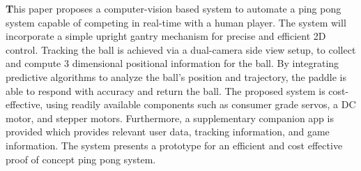 \textbf
This paper proposes a computer-vision based system to automate a ping pong system capable of competing in real-time with a human player. The system will incorporate a simple upright gantry mechanism for precise and efficient 2D control. Tracking the ball is achieved via a dual-camera side view setup, to collect and compute 3 dimensional positional information for the ball. By integrating predictive algorithms to analyze the ball's position and trajectory, the paddle is able to respond with accuracy and return the ball. The proposed system is cost-effective, using readily available components such as consumer grade servos, a DC motor, and stepper motors. Furthermore, a supplementary companion app is provided which provides relevant user data, tracking information, and game information. The system presents a prototype for an efficient and cost effective proof of concept ping pong system.